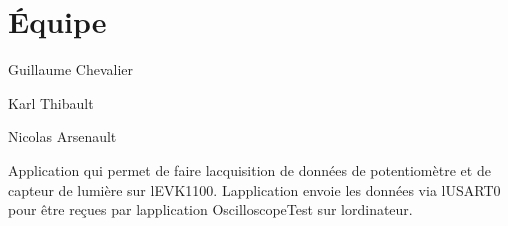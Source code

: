 \section*{Équipe }


\begin{DoxyItemize}
\item Guillaume Chevalier
\item Karl Thibault
\item Nicolas Arsenault
\end{DoxyItemize}

\begin{DoxyParagraph}{Application qui permet de faire l\textquotesingle{}acquisition de données de potentiomètre et de capteur de lumière sur l\textquotesingle{}E\+V\+K1100.}
L\textquotesingle{}application envoie les données via l\textquotesingle{}U\+S\+A\+R\+T0 pour être reçues par l\textquotesingle{}application Oscilloscope\+Test sur l\textquotesingle{}ordinateur. 
\end{DoxyParagraph}
